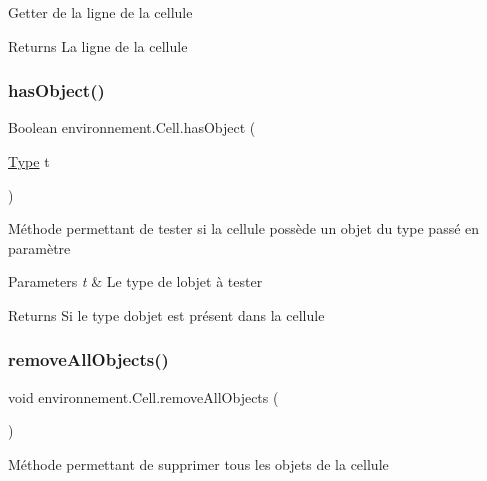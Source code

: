 Getter de la ligne de la cellule \begin{DoxyReturn}{Returns}
La ligne de la cellule 
\end{DoxyReturn}
\hypertarget{classenvironnement_1_1_cell_a3551332fb08fc588ca65714cc7642046}{}\label{classenvironnement_1_1_cell_a3551332fb08fc588ca65714cc7642046} 
\subsubsection{\texorpdfstring{has\+Object()}{hasObject()}}
{\footnotesize\ttfamily Boolean environnement.\+Cell.\+has\+Object (\begin{DoxyParamCaption}\item[{\hyperlink{enumenvironnement_1_1_type}{Type}}]{t }\end{DoxyParamCaption})}

Méthode permettant de tester si la cellule possède un objet du type passé en paramètre 
\begin{DoxyParams}{Parameters}
{\em t} & Le type de l\textquotesingle{}objet à tester \\
\hline
\end{DoxyParams}
\begin{DoxyReturn}{Returns}
Si le type d\textquotesingle{}objet est présent dans la cellule 
\end{DoxyReturn}
\hypertarget{classenvironnement_1_1_cell_a1844f98b1999045deb72d45c7ec0ff21}{}\label{classenvironnement_1_1_cell_a1844f98b1999045deb72d45c7ec0ff21} 
\subsubsection{\texorpdfstring{remove\+All\+Objects()}{removeAllObjects()}}
{\footnotesize\ttfamily void environnement.\+Cell.\+remove\+All\+Objects (\begin{DoxyParamCaption}{ }\end{DoxyParamCaption})}

Méthode permettant de supprimer tous les objets de la cellule \hypertarget{classenvironnement_1_1_cell_ad83c17c96dae12f864af43ad546f86f3}{}\label{classenvironnement_1_1_cell_ad83c17c96dae12f864af43ad546f86f3} 
